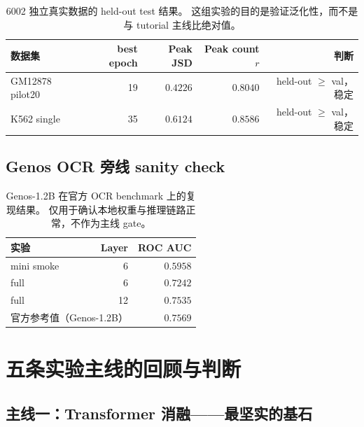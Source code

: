 \documentclass[11pt,a4paper]{ctexart}
\begin{document}
\begin{table}[H]
\centering
\small
\caption{6002 独立真实数据的 held-out test 结果。
这组实验的目的是验证泛化性，而不是与 tutorial 主线比绝对值。}
\label{tab:independent}
\begin{tabular}{lrrrr}
\toprule
数据集 & best epoch & Peak JSD & Peak count $r$ & 判断 \\
\midrule
GM12878 pilot20 & 19 & $0.4226$ & $0.8040$ & held-out $\geq$ val，稳定 \\
K562 single & 35 & $0.6124$ & $0.8586$ & held-out $\geq$ val，稳定 \\
\bottomrule
\end{tabular}
\end{table}

\subsection{Genos OCR 旁线 sanity check}

\begin{table}[H]
\centering
\small
\caption{Genos-1.2B 在官方 OCR benchmark 上的复现结果。
仅用于确认本地权重与推理链路正常，不作为主线 gate。}
\label{tab:ocr}
\begin{tabular}{lrr}
\toprule
实验 & Layer & ROC AUC \\
\midrule
mini smoke & 6 & $0.5958$ \\
full & 6 & $0.7242$ \\
full & 12 & $0.7535$ \\
\midrule
\multicolumn{2}{l}{官方参考值（Genos-1.2B）} & $0.7569$ \\
\bottomrule
\end{tabular}
\end{table}

\section{五条实验主线的回顾与判断}
\label{sec:five-lines}

\subsection{主线一：Transformer 消融——最坚实的基石}
\end{document}

